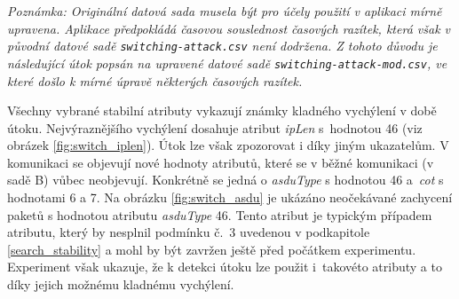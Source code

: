 \emph{Poznámka: Originální datová sada musela být pro účely použití v aplikaci mírně upravena. Aplikace předpokládá časovou souslednost časových razítek, která však v původní datové sadě \texttt{switching-attack.csv} není dodržena. Z tohoto důvodu je následující útok popsán na upravené datové sadě \texttt{switching-attack-mod.csv}, ve které došlo k mírné úpravě některých časových razítek.}

\bigskip

\noindent Všechny vybrané stabilní atributy vykazují známky kladného vychýlení v době útoku. Nejvýraznějšího vychýlení dosahuje atribut \emph{ipLen} s~hodnotou 46 (viz obrázek \ref{fig:switch_iplen}). Útok lze však zpozorovat i díky jiným ukazatelům. V komunikaci se objevují nové hodnoty atributů, které se v běžné komunikaci (v sadě B) vůbec neobjevují. Konkrétně se jedná o \emph{asduType} s hodnotou 46 a~\emph{cot} s hodnotami 6 a 7. Na obrázku \ref{fig:switch_asdu} je ukázáno neočekávané zachycení paketů s hodnotou atributu \emph{asduType} 46. Tento atribut je typickým případem atributu, který by nesplnil podmínku č.~3 uvedenou v podkapitole \ref{search_stability} a mohl by být zavržen ještě před počátkem experimentu. Experiment však ukazuje, že k detekci útoku lze použit i~takovéto atributy a to díky jejich možnému kladnému vychýlení.



